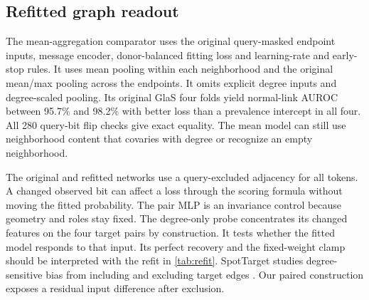 \subsection{Refitted graph readout}
The mean-aggregation comparator uses the original query-masked endpoint inputs, message encoder, donor-balanced fitting loss and learning-rate and early-stop rules. It uses mean pooling within each neighborhood and the original mean/max pooling across the endpoints. It omits explicit degree inputs and degree-scaled pooling. Its original GlaS four folds yield normal-link AUROC between 95.7\% and 98.2\% with better loss than a prevalence intercept in all four. All 280 query-bit flip checks give exact equality. The mean model can still use neighborhood content that covaries with degree or recognize an empty neighborhood.

\begin{table}[t]
\centering
\caption{\textbf{Response after refitting with mean aggregation.} AUC and top-four recovery use absolute matched probability change and donor-macro aggregation. Top-four change is refit minus original in percentage points. Intervals are donor-paired. The tiers share donors.}
\label{tab:refit}
\small

\end{table}

The original and refitted networks use a query-excluded adjacency for all tokens. A changed observed bit can affect a loss through the scoring formula without moving the fitted probability. The pair MLP is an invariance control because geometry and roles stay fixed. The degree-only probe concentrates its changed features on the four target pairs by construction. It tests whether the fitted model responds to that input. Its perfect recovery and the fixed-weight clamp should be interpreted with the refit in \cref{tab:refit}. SpotTarget studies degree-sensitive bias from including and excluding target edges \cite{zhu2024spot}. Our paired construction exposes a residual input difference after exclusion.

\clearpage
